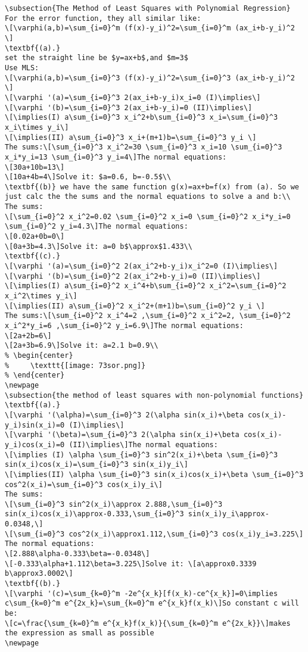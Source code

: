 \begin{verbatim}
\subsection{The Method of Least Squares with Polynomial Regression}
For the error function, they all similar like:
\[\varphi(a,b)=\sum_{i=0}^m (f(x)-y_i)^2=\sum_{i=0}^m (ax_i+b-y_i)^2 \]
\textbf{(a).}
set the straight line be $y=ax+b$,and $m=3$
Use MLS:
\[\varphi(a,b)=\sum_{i=0}^3 (f(x)-y_i)^2=\sum_{i=0}^3 (ax_i+b-y_i)^2 \]
\[\varphi '(a)=\sum_{i=0}^3 2(ax_i+b-y_i)x_i=0 (I)\implies\]
\[\varphi '(b)=\sum_{i=0}^3 2(ax_i+b-y_i)=0 (II)\implies\]
\[\implies(I) a\sum_{i=0}^3 x_i^2+b\sum_{i=0}^3 x_i=\sum_{i=0}^3 x_i\times y_i\]
\[\implies(II) a\sum_{i=0}^3 x_i+(m+1)b=\sum_{i=0}^3 y_i \]
The sums:\[\sum_{i=0}^3 x_i^2=30 \sum_{i=0}^3 x_i=10 \sum_{i=0}^3 x_i*y_i=13 \sum_{i=0}^3 y_i=4\]The normal equations:
\[30a+10b=13\]
\[10a+4b=4\]Solve it: $a=0.6, b=-0.5$\\
\textbf{(b)} we have the same function g(x)=ax+b=f(x) from (a). So we just calc the the sums and the normal equations to solve a and b:\\
The sums:
\[\sum_{i=0}^2 x_i^2=0.02 \sum_{i=0}^2 x_i=0 \sum_{i=0}^2 x_i*y_i=0 \sum_{i=0}^2 y_i=4.3\]The normal equations:
\[0.02a+0b=0\]
\[0a+3b=4.3\]Solve it: a=0 b$\approx$1.433\\
\textbf{(c).}
\[\varphi '(a)=\sum_{i=0}^2 2(ax_i^2+b-y_i)x_i^2=0 (I)\implies\]
\[\varphi '(b)=\sum_{i=0}^2 2(ax_i^2+b-y_i)=0 (II)\implies\]
\[\implies(I) a\sum_{i=0}^2 x_i^4+b\sum_{i=0}^2 x_i^2=\sum_{i=0}^2 x_i^2\times y_i\]
\[\implies(II) a\sum_{i=0}^2 x_i^2+(m+1)b=\sum_{i=0}^2 y_i \]
The sums:\[\sum_{i=0}^2 x_i^4=2 ,\sum_{i=0}^2 x_i^2=2, \sum_{i=0}^2 x_i^2*y_i=6 ,\sum_{i=0}^2 y_i=6.9\]The normal equations:
\[2a+2b=6\]
\[2a+3b=6.9\]Solve it: a=2.1 b=0.9\\
% \begin{center}
%     \texttt{[image: 73sor.png]}
% \end{center}
\newpage
\subsection{the method of least squares with non-polynomial functions}
\textbf{(a).}
\[\varphi '(\alpha)=\sum_{i=0}^3 2(\alpha sin(x_i)+\beta cos(x_i)-y_i)sin(x_i)=0 (I)\implies\]
\[\varphi '(\beta)=\sum_{i=0}^3 2(\alpha sin(x_i)+\beta cos(x_i)-y_i)cos(x_i)=0 (II)\implies\]The normal equations:
\[\implies (I) \alpha \sum_{i=0}^3 sin^2(x_i)+\beta \sum_{i=0}^3 sin(x_i)cos(x_i)=\sum_{i=0}^3 sin(x_i)y_i\]
\[\implies(II) \alpha \sum_{i=0}^3 sin(x_i)cos(x_i)+\beta \sum_{i=0}^3 cos^2(x_i)=\sum_{i=0}^3 cos(x_i)y_i\]
The sums:
\[\sum_{i=0}^3 sin^2(x_i)\approx 2.888,\sum_{i=0}^3 sin(x_i)cos(x_i)\approx-0.333,\sum_{i=0}^3 sin(x_i)y_i\approx-0.0348,\]
\[\sum_{i=0}^3 cos^2(x_i)\approx1.112,\sum_{i=0}^3 cos(x_i)y_i=3.225\]
The normal equations:
\[2.888\alpha-0.333\beta=-0.0348\]
\[-0.333\alpha+1.112\beta=3.225\]Solve it: \[a\approx0.3339 b\approx3.0002\]
\textbf{(b).}
\[\varphi '(c)=\sum_{k=0}^m -2e^{x_k}[f(x_k)-ce^{x_k}]=0\implies c\sum_{k=0}^m e^{2x_k}=\sum_{k=0}^m e^{x_k}f(x_k)\]So constant c will be:
\[c=\frac{\sum_{k=0}^m e^{x_k}f(x_k)}{\sum_{k=0}^m e^{2x_k}}\]makes the expression as small as possible
\newpage

\end{verbatim}
